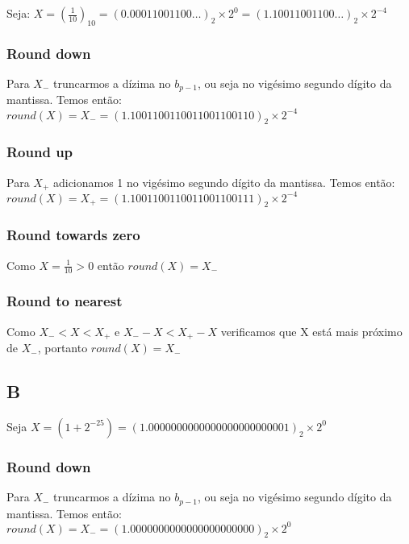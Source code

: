       Seja: $ X = (\frac{1}{10})_{10} = (0.000 1100 1100 \dots)_{2} \times 2^{0} = (1.100 1100 1100 \dots)_{2} \times 2^{-4}$

      \subsubsection*{Round down}
        Para $X_{-} $ truncarmos a dízima no $b_{p-1}$, ou seja no vigésimo segundo dígito da mantissa. Temos então: \\

        $round(X) = X_{-} = (1.100 1100 1100 1100 1100 110)_{2} \times 2^{-4}$

      \subsubsection*{Round up}
        Para $X_{+} $ adicionamos 1 no vigésimo segundo dígito da mantissa. Temos então: \\

        $round(X) = X_{+} = (1.100 1100 1100 1100 1100 111)_{2} \times 2^{-4}$

      \subsubsection*{Round towards zero}
        Como $X = \frac{1}{10} > 0$ então $round(X) = X_{-}$

      \subsubsection*{Round to nearest}
        Como $X_{-} < X < X_{+}$ e $X_{-} - X < X_{+} - X $ verificamos que X está mais próximo de $X_{-}$, portanto $round(X) = X_{-}$\\

    \subsection{B}
      Seja $ X = (1 + 2^{-25}) = (1.000 000 000 000 000 000 000 000 1)_2 \times 2^{0}$

      \subsubsection*{Round down}
        Para $X_{-} $ truncarmos a dízima no $b_{p-1}$, ou seja no vigésimo segundo dígito da mantissa. Temos então: \\

        $round(X) = X_{-} = (1.000 000 000 000 000 000 000 0)_{2} \times 2^{0}$
